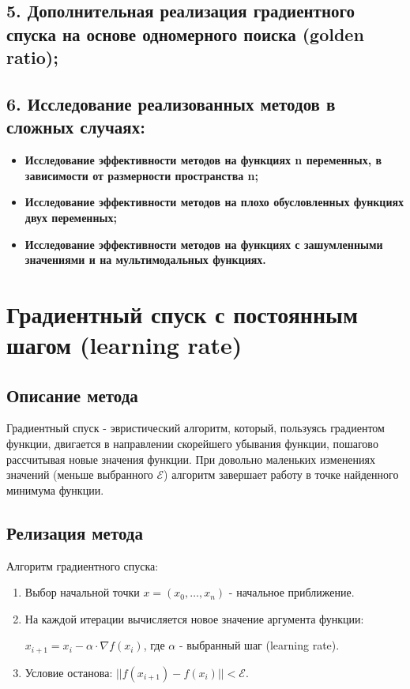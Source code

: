 \documentclass{article}
\begin{document}
\subsection*{5. Дополнительная реализация градиентного спуска на основе одномерного поиска (golden ratio);}
\subsection*{6. Исследование реализованных методов в сложных случаях:}
\begin{itemize}
    \item \textbf{Исследование эффективности методов на функциях n переменных, в зависимости от размерности пространства n;}
    \item \textbf{Исследование эффективности методов на плохо обусловленных функциях двух переменных;}
    \item \textbf{Исследование эффективности методов на функциях с зашумленными значениями и на мультимодальных функциях.}
\end{itemize}

\newpage
\section*{Градиентный спуск с постоянным шагом (learning rate)}
\subsection*{Описание метода}
Градиентный спуск - эвристический алгоритм, который, пользуясь градиентом функции, двигается в направлении скорейшего убывания функции, пошагово рассчитывая новые значения функции. При довольно маленьких изменениях значений (меньше выбранного $\mathcal{E}$) алгоритм завершает работу в точке найденного минимума функции.
\subsection*{Релизация метода}
Алгоритм градиентного спуска:
\begin{enumerate}
    \item Выбор начальной точки $x = (x_0, \dots, x_n)$ - начальное приближение.
    \item На каждой итерации вычисляется новое значение аргумента функции:
    
    $x_{i+1} = x_i - \alpha \cdot \nabla f(x_i)$, где $\alpha$ - выбранный шаг (learning rate).
    \item Условие останова: $|| f(x_{i+1}) - f(x_i) || < \mathcal{E}$.
\end{enumerate}
\end{document}
